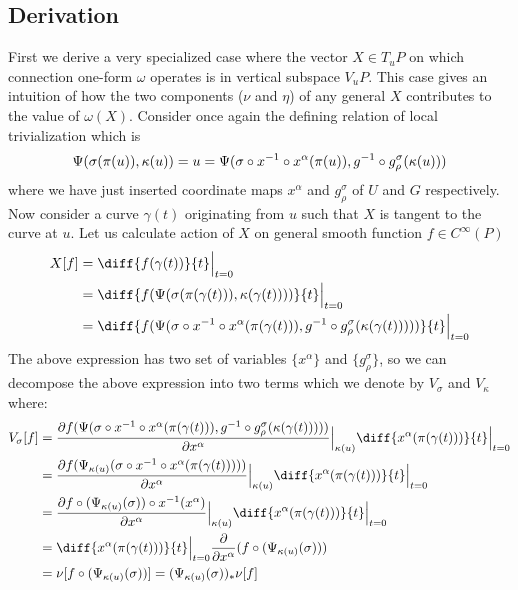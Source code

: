 \documentclass[12pt]{article}
\begin{document}
\subsection{Derivation}{\label{derivation}}
First we derive a very specialized case where the vector $X \in T_{u}P$ on which connection one-form $\omega$ operates is in vertical subspace $V_{u}P$. This case gives an intuition of how the two components ($\nu$ and $\eta$) of any general $X$ contributes to the value of $\omega(X)$. Consider once again the defining relation of local trivialization which is
\begin{equation}{\label{u}}
    \Psi(\sigma(\pi(u)), \kappa(u)) = u = \Psi(\sigma\circ x^{-1}\circ x^{\alpha}(\pi(u)), g^{-1}\circ g^{\sigma}_{\rho}(\kappa(u)))
\end{equation} where we have just inserted coordinate maps $x^{\alpha}$ and $g^{\sigma}_{\rho}$ of $U$ and $G$ respectively. Now consider a curve $\gamma(t)$ originating from $u$ such that $X$ is tangent to the curve at $u$. Let us calculate action of $X$ on general smooth function $f \in C^{\infty}(P)$ \\
\begin{align*}
    X[f] &= \diff{f(\gamma(t))}{t}\Bigr|_{t=0} \\
         &= \diff{f(\Psi(\sigma(\pi(\gamma(t))), \kappa(\gamma(t))))}{t}\Bigr|_{t=0} \\
         &= \diff{f(\Psi(\sigma\circ x^{-1}\circ x^{\alpha}(\pi(\gamma(t))), g^{-1}\circ g^{\sigma}_{\rho}(\kappa(\gamma(t)))))}{t}\Bigr|_{t=0} \\
\end{align*} The above expression has two set of variables $\{x^{\alpha}\}$ and $\{g^{\sigma}_{\rho}\}$, so we can decompose the above expression into two terms which we denote by $V_{\sigma}$ and $V_{\kappa}$ where: \\
\begin{align*}
    V_{\sigma}[f] &= \frac{\partial f(\Psi(\sigma\circ x^{-1}\circ x^{\alpha}(\pi(\gamma(t))), g^{-1}\circ g^{\sigma}_{\rho}(\kappa(\gamma(t)))))}{\partial x^{\alpha}}\Bigr|_{\kappa(u)}\diff{x^{\alpha}(\pi(\gamma(t)))}{t}\Bigr|_{t=0} \\
               &= \frac{\partial f(\Psi_{\kappa(u)}(\sigma\circ x^{-1}\circ x^{\alpha}(\pi(\gamma(t)))))}{\partial x^{\alpha}}\Bigr|_{\kappa(u)}\diff{x^{\alpha}(\pi(\gamma(t)))}{t}\Bigr|_{t=0} \\
               &= \frac{\partial f\circ (\Psi_{\kappa(u)}(\sigma))\circ x^{-1}(x^{\alpha})}{\partial x^{\alpha}}\Bigr|_{\kappa(u)}\diff{x^{\alpha}(\pi(\gamma(t)))}{t}\Bigr|_{t=0} \\
               &= \diff{x^{\alpha}(\pi(\gamma(t)))}{t}\Bigr|_{t=0}\frac{\partial}{\partial x^{\alpha}}(f\circ (\Psi_{\kappa(u)}(\sigma))) \\
               &= \nu[f\circ (\Psi_{\kappa(u)}(\sigma))] = (\Psi_{\kappa(u)}(\sigma))_{\ast}\nu[f]
\end{align*}
\end{document}
